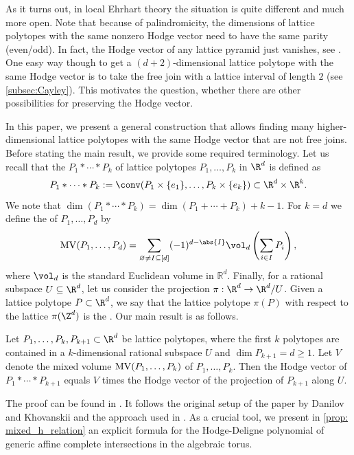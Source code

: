 \documentclass[reqno, 11pt, a4paper, oneside]{amsart}
\def\MV{{\rm MV}}
\begin{document}
As it turns out, in local Ehrhart theory the situation is quite different and much more open. Note that because of palindromicity, the dimensions of lattice polytopes with the same nonzero Hodge vector need to have the same parity (even/odd). In fact, the Hodge vector of any lattice pyramid just vanishes, see \cite[Lemma~4.5]{batyrev_combinatorial_2008}. One easy way though to get a $(d+2)$-dimensional lattice polytope with the same Hodge vector is to take the free join with a lattice interval of length $2$ (see \ref{subsec:Cayley}). This motivates the question, whether there are other possibilities for preserving the Hodge vector.

In this paper, we present a general construction that allows finding  many higher-dimensional lattice polytopes with the same Hodge vector that are not free joins. Before stating the main result, we provide some required terminology. 
Let us recall that the  $P_1 * \cdots * P_k$ of lattice polytopes $P_1, \ldots, P_k$ in $\R^d$ is defined as
\[P_1 * \cdots * P_k := \conv(P_1 \times \{e_1\}, \ldots, P_k \times \{e_k\}) \subset \R^d \times \R^k.\]
We note that $\dim(P_1 * \cdots * P_k) = \dim(P_1 + \cdots + P_k) + k -1$.  For $k=d$ we define the  of $P_1,\ldots, P_d$ by 
\[ \MV(P_1, \ldots, P_d) = \sum_{\varnothing \neq I \subseteq [d]} (-1)^{d-\abs{I}} \vol_{d} \left( \sum_{i \in I} P_i \right), \] where $\vol_d$ is the standard Euclidean volume in $\mathbb{R}^d$. Finally,
for a rational subspace $U \subseteq \R^d$, let us consider the projection $\pi: \R^d \rightarrow \R^d/U$. Given a  lattice polytope $P \subset \R^d$,  we say that the lattice polytope $\pi(P)$ with respect to the lattice $\pi(\Z^d)$ is the . Our main result is as follows.   
\begin{thm}\label{thm:main}
Let $P_1,\ldots,P_k, P_{k+1} \subset \R^d$ be lattice polytopes, where the first $k$ polytopes are contained in a $k$-dimensional rational subspace $U$ and $\dim P_{k+1}=d \geq 1$. Let $V$ denote the mixed volume $\MV(P_1, \ldots, P_k)$ of $P_1, \ldots, P_k$. Then the Hodge vector of $P_1 * \cdots * P_{k+1}$ equals $V$ times the Hodge vector of the projection of $P_{k+1}$ along $U$. 
\end{thm}



The proof can be found in . It follows the original setup of the paper \cite{danilov_newton_1987} by Danilov and Khovanskii and the approach used in \cite{di_rocco_discrete_2016}. As a crucial tool, we present in \cref{prop: mixed_h_relation} an explicit formula  for the Hodge-Deligne polynomial of generic affine complete intersections in the algebraic torus.
\end{document}
